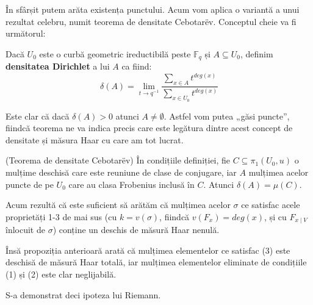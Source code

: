 \documentclass[13pt,openany,oneside]{book}
\begin{document}
În sfârșit putem arăta existența punctului. Acum vom aplica o variantă a unui rezultat celebru, numit teorema de densitate Cebotarëv. Conceptul cheie va fi următorul:

\begin{defi}
Dacă $U_0$ este o curbă geometric ireductibilă peste $\mathbb{F}_q$ și $A \subseteq U_0$, definim {\bf densitatea Dirichlet} a lui $A$ ca fiind:
$$\delta(A) = \lim_{t \to q^{-1}} \frac{\sum\limits_{x \in A} t^{deg(x)}}{\sum\limits_{x \in U_0} t^{deg(x)}}$$
\end{defi}

Este clar că dacă $\delta(A)>0$ atunci $A\neq\emptyset$. Astfel vom putea „găsi puncte”, fiindcă teorema ne va indica precis care este legătura dintre acest concept de densitate și măsura Haar cu care am tot lucrat.

\begin{teo}
(Teorema de densitate Cebotarëv) În condițiile definiției, fie $C \subseteq \pi_1(U_0,u)$ o mulțime deschisă care este reuniune de clase de conjugare, iar $A$ mulțimea acelor puncte de pe $U_0$ care au clasa Frobenius inclusă în $C$. Atunci $\delta(A)=\mu(C)$.
\end{teo}

Acum rezultă că este suficient să arătăm că mulțimea acelor $\sigma$ ce satisfac acele proprietăți 1-3 de mai sus (cu $k=v(\sigma)$, fiindcă $v(F_x)=deg(x)$, și cu $F_{x\mid V}$ înlocuit de $\sigma$) conține un deschis de măsură Haar nenulă.

Însă propoziția anterioară arată că mulțimea elementelor ce satisfac (3) este deschisă de măsură Haar totală, iar mulțimea elementelor eliminate de condițiile (1) și (2) este clar neglijabilă.

S-a demonstrat deci ipoteza lui Riemann.



\end{document}
